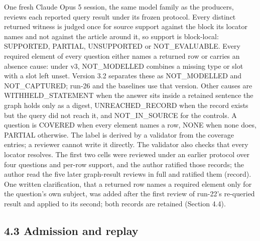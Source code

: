 One fresh Claude Opus 5 session, the same model family as the producers, reviews each reported query result under its frozen protocol. Every distinct returned witness is judged once for source support against the block its locator names and not against the article around it, so support is block-local: SUPPORTED, PARTIAL, UNSUPPORTED or NOT\_\allowbreak{}EVALUABLE. Every required element of every question either names a returned row or carries an absence cause: under v3, NOT\_\allowbreak{}MODELLED combines a missing type or slot with a slot left unset. Version 3.2 separates these as NOT\_\allowbreak{}MODELLED and NOT\_\allowbreak{}CAPTURED; run-26 and the baselines use that version. Other causes are WITHHELD\_\allowbreak{}STATEMENT when the answer sits inside a retained sentence the graph holds only as a digest, UNREACHED\_\allowbreak{}RECORD when the record exists but the query did not reach it, and NOT\_\allowbreak{}IN\_\allowbreak{}SOURCE for the controls. A question is COVERED when every element names a row, NONE when none does, PARTIAL otherwise. The label is derived by a validator from the coverage entries; a reviewer cannot write it directly. The validator also checks that every locator resolves. The first two cells were reviewed under an earlier protocol over four questions and per-row support, and the author ratified those records; the author read the five later graph-result reviews in full and ratified them (record). One written clarification, that a returned row names a required element only for the question's own subject, was added after the first review of run-22's re-queried result and applied to its second; both records are retained (Section 4.4).

\subsection*{4.3 Admission and replay}

